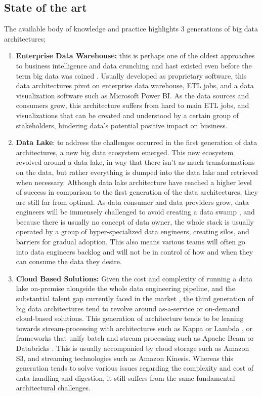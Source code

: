 \documentclass[review]{elsarticle}
\begin{document}
\subsection{State of the art}

The available body of knowledge and practice highlights 3 generations of big data architectures; 

\begin{enumerate}
    \item \textbf{Enterprise Data Warehouse:} this is perhaps one of the oldest approaches to business intelligence and data crunching and hast existed even before the term big data was coined \cite{leonard2011design}. Usually developed as proprietary software, this data architectures pivot on enterprise data warehouse, ETL jobs, and a data visualization software such as Microsoft Power BI. As the data sources and consumers grow, this architecture suffers from hard to main ETL jobs, and visualizations that can be created and understood by a certain group of stakeholders, hindering data's potential positive impact on business. 
    \item \textbf{Data Lake}: to address the challenges occurred in the first generation of data architectures, a new big data ecosystem emerged. This new ecosystem revolved around a data lake, in way that there isn't as much transformations on the data, but rather everything is dumped into the data lake and retrieved when necessary. Although data lake architecture have reached a higher level of success in comparison to the first generation of the data architectures, they are still far from optimal. As data consumer and data providers grow, data engineers will be immensely challenged to avoid creating a data swamp \cite{brackenbury2018draining}, and because there is usually no concept of data owner, the whole stack is usually operated by a group of hyper-specialized data engineers, creating silos, and barriers for gradual adoption. This also means various teams will often go into data engineers backlog and will not be in control of how and when they can consume the data they desire.
    \item \textbf{Cloud Based Solutions:} Given the cost and complexity of running a data lake on-premise alongside the whole data engineering pipeline, and the substantial talent gap currently faced in the market \cite{AtaeiHype}, the third generation of big data architectures tend to revolve around as-a-service or on-demand cloud-based solutions. This generation of architecture tends to be leaning towards stream-processing with architectures such as Kappa or Lambda \cite{lin2017lambda}, or frameworks that unify batch and stream processing such as Apache Beam \cite{ApachBeam} or Databricks \cite{DataBricks}. This is usually accompanied by cloud storage such as Amazon S3, and streaming technologies such as Amazon Kinesis. Whereas this generation tends to solve various issues regarding the complexity and cost of data handling and digestion, it still suffers from the same fundamental architectural challenges.
\end{enumerate}
\end{document}
